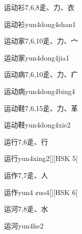 \begin{Entry}{运动衫}{7,6,8}{⾡、⼒、⾐}
  \begin{Phonetics}{运动衫}{yun4dong4shan1}
  \end{Phonetics}
\end{Entry}

\begin{Entry}{运动家}{7,6,10}{⾡、⼒、⼧}
  \begin{Phonetics}{运动家}{yun4dong4jia1}
  \end{Phonetics}
\end{Entry}

\begin{Entry}{运动病}{7,6,10}{⾡、⼒、⽧}
  \begin{Phonetics}{运动病}{yun4dong4bing4}
  \end{Phonetics}
\end{Entry}

\begin{Entry}{运动鞋}{7,6,15}{⾡、⼒、⾰}
  \begin{Phonetics}{运动鞋}{yun4dong4xie2}
  \end{Phonetics}
\end{Entry}

\begin{Entry}{运行}{7,6}{⾡、⾏}
  \begin{Phonetics}{运行}{yun4xing2}[][HSK 5]
  \end{Phonetics}
\end{Entry}

\begin{Entry}{运作}{7,7}{⾡、⼈}
  \begin{Phonetics}{运作}{yun4 zuo4}[][HSK 6]
  \end{Phonetics}
\end{Entry}

\begin{Entry}{运河}{7,8}{⾡、⽔}
  \begin{Phonetics}{运河}{yun4he2}
  \end{Phonetics}
\end{Entry}

